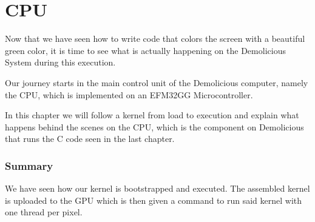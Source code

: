 \documentclass[../main/report.tex]{subfiles}
\begin{document}
\chapter{CPU}

Now that we have seen how to write code that colors the screen with a beautiful green color, 
it is time to see what is actually happening on the Demolicious System during this execution. 

Our journey starts in the main control unit of the Demolicious computer, namely the CPU, which is implemented on an EFM32GG Microcontroller.

In this chapter we will follow a kernel from load to execution and explain what happens behind the scenes on the CPU, which is the component on Demolicious that runs the C code seen in the last chapter.











\subsection{Summary}

We have seen how our kernel is bootstrapped and executed. 
The assembled kernel is uploaded to the GPU which is then given a command to run said kernel with one thread per pixel.
\end{document}
